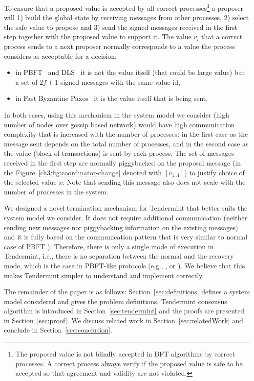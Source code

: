 To ensure that a proposed value is accepted by all correct processes\footnote{The proposed value is not blindly accepted in BFT algorithms by correct processes. A correct process always verify if the proposed value is safe to be accepted so that agreement and validity are not violated.} a proposer will 1) build the global state by receiving messages from other processes, 2) select the safe value to propose and 3) send the signed messages received in the first step together with the proposed value to support it. The value $v_i$ that a correct process sends to a next proposer normally corresponds to a value the process considers as acceptable for a decision: 

\begin{itemize}
	\item in PBFT~\cite{CL99:osdi} and DLS~\cite{DLS88:jacm} it is not the value itself (that could be large value) but a set of $2f+1$ signed messages with the same value id,
	\item in Fast Byzantine Paxos~\cite{MA06:tdsc} it is the value itself that is being sent.  
\end{itemize}

In both cases, using this mechanism in the system model we consider (high number of nodes over gossip based network) would have high communication complexity that is increased with the number of processes: in the first case as the message sent depends on the total number of processes, and in the second case as the value (block of transactions) is sent by each process. The set of messages received in the first step are normally piggybacked on the proposal message (in the Figure~\ref{ch3:fig:coordinator-change} denoted with $[v_{1..4}]$) to justify choice of the selected value $x$. Note that sending this message also does not scale with the number of processes in the system.   

We designed a novel termination mechanism for Tendermint that better suits the system model we consider. It does not require additional communication (neither sending new messages nor piggybacking information on the existing messages) and it is
fully based on the communication pattern that is very similar to normal case of PBFT \cite{CL99:osdi}). Therefore, there is only a single mode of execution in Tendermint, i.e., there is no separation between the normal and the recovery mode, which is the case in PBFT-like protocols (e.g., \cite{CL99:osdi}, \cite{Ver09:spinning} or \cite{Cle09:aardvark}). We believe that this makes Tendermint simpler to understand and implement correctly.  

The remainder of the paper is as follows: Section~\ref{sec:definitions} defines a system model considered and gives the problem definitions. Tendermint consensus algorithm 
is introduced in Section~\ref{sec:tendermint} and the proofs are presented in Section~\ref{sec:proof}. We discuss related work in Section~\ref{sec:relatedWork} and conclude in Section~\ref{sec:conclusion}.  


 